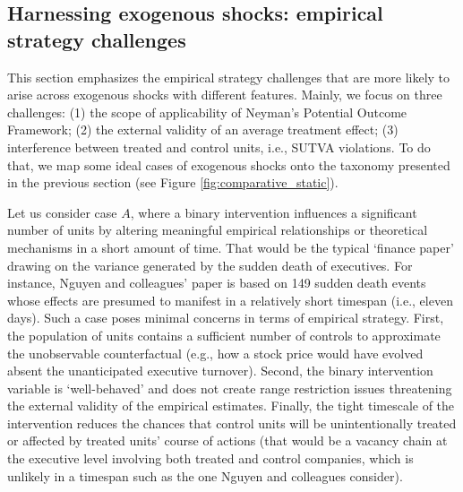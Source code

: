\documentclass[11pt]{article}
\begin{document}
\begin{refsection}
\section{Harnessing exogenous shocks: empirical strategy challenges}
\label{sec:harnessing_exogenous_shocks}

\noindent This section emphasizes the empirical strategy challenges that are
more 
likely to arise across exogenous shocks with different features. Mainly,
we focus on three challenges: (1) the scope of applicability of Neyman's
Potential Outcome Framework; (2) the external validity of an average treatment 
effect; (3) interference between treated and control units, i.e., SUTVA 
violations. To do that, we map some ideal cases of exogenous shocks onto the
taxonomy presented in
the previous section (see Figure \ref{fig:comparative_static}).

Let us consider case $A$, where a binary intervention influences a significant
number of units by altering meaningful empirical relationships or theoretical
mechanisms in a short amount of time. That would be the typical `finance paper'
drawing on the variance generated by the sudden death of executives. For
instance, Nguyen and colleagues' \autocite*{nguyen_et_al_2014} paper is based
on 149
sudden death events whose effects are presumed to manifest in a relatively
short
timespan (i.e., eleven days). Such a case poses minimal concerns in terms of
empirical strategy.  First, the population of units contains a sufficient
number of
controls to approximate the unobservable counterfactual (e.g., how a stock
price
would have evolved absent the unanticipated executive turnover). Second, the
binary intervention variable is `well-behaved' and does not create range
restriction issues threatening the external validity of the empirical
estimates.
Finally, the tight timescale of the intervention reduces the chances that
control units will be unintentionally treated or affected by treated units'
course of actions (that would be a vacancy chain at the executive
level involving both treated and control companies, which is unlikely in a
timespan such as the one Nguyen and colleagues \autocite*{nguyen_et_al_2014}
consider). 

\vspace{2em}


\end{refsection}
\end{document}
